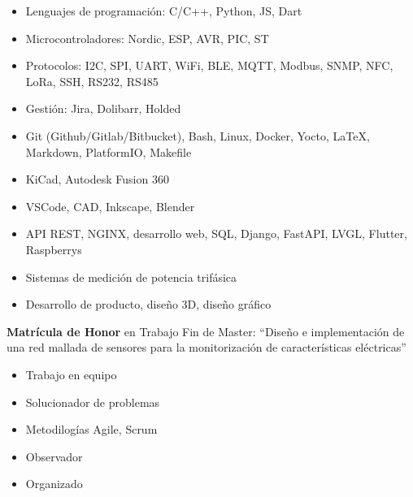 \documentclass[10pt,a4paper,ragged2e,withhyper]{altacv}
\begin{document}
\begin{paracol}{2}
\begin{itemize}
    \setlength{\itemindent}{0.5em}
    \item Lenguajes de programación: C/C++, Python, JS, Dart
    \item Microcontroladores: Nordic, ESP, AVR, PIC, ST
    \item Protocolos: I2C, SPI, UART, WiFi, BLE, MQTT, Modbus, SNMP, NFC, LoRa, SSH, RS232, RS485
    \item Gestión: Jira, Dolibarr, Holded
    \item Git (Github/Gitlab/Bitbucket), Bash, Linux, Docker, Yocto, LaTeX, Markdown, PlatformIO, Makefile
    \item KiCad, Autodesk Fusion 360
    \item VSCode, CAD, Inkscape, Blender
    \item API REST, NGINX, desarrollo web, SQL, Django, FastAPI, LVGL, Flutter, Raspberrys
    \item Sistemas de medición de potencia trifásica
    \item Desarrollo de producto, diseño 3D, diseño gráfico
\end{itemize}

\switchcolumn



\textbf{Matrícula de Honor} en Trabajo Fin de Master: “Diseño e implementación de una red mallada de sensores para la monitorización de características eléctricas”

\divider


\divider



\divider

\medskip


\begin{itemize}
    \setlength{\itemindent}{0.5em}
    \item Trabajo en equipo
    \item Solucionador de problemas
    \item Metodilogías Agile, Scrum
    \item Observador
    \item Organizado
\end{itemize}


\end{paracol}
\end{document}
